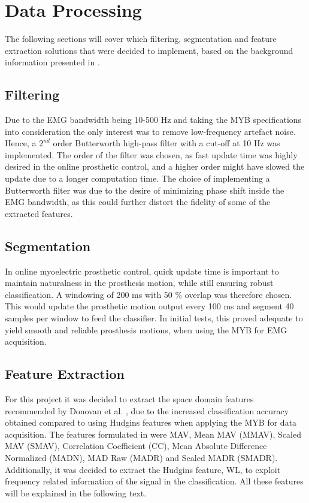 \section{Data Processing}
The following sections will cover which filtering, segmentation and feature extraction solutions that were decided to implement, based on the background information presented in . 

\subsection{Filtering}
Due to the EMG bandwidth being 10-500 Hz and taking the MYB specifications into consideration the only interest was to remove low-frequency artefact noise. Hence, a $2^{nd}$ order Butterworth high-pass filter with a cut-off at 10 Hz was implemented. The order of the filter was chosen, as fast update time was highly desired in the online prosthetic control, and a higher order might have slowed the update due to a longer computation time. The choice of implementing a Butterworth filter was due to the desire of minimizing phase shift inside the EMG bandwidth, as this could further distort the fidelity of some of the extracted features. 

\subsection{Segmentation}
In online myoelectric prosthetic control, quick update time is important to maintain naturalness in the prosthesis motion, while still ensuring robust classification. A windowing of 200 ms with 50 \% overlap was therefore chosen. This would update the prosthetic motion output every 100 ms and segment 40 samples per window to feed the classifier. In initial tests, this proved adequate to yield smooth and reliable prosthesis motions, when using the MYB for EMG acquisition. 

\subsection{Feature Extraction}
For this project it was decided to extract the space domain features recommended by Donovan et al. \cite{Donovan2017}, due to the increased classification accuracy obtained compared to using Hudgins features when applying the MYB for data acquisition. The features formulated in \cite{Donovan2017} were MAV, Mean MAV (MMAV), Scaled MAV (SMAV), Correlation Coefficient (CC), Mean Absolute Difference Normalized (MADN), MAD Raw (MADR) and Scaled MADR (SMADR). Additionally, it was decided to extract the Hudgins feature, WL, to exploit frequency related information of the signal in the classification. All these features will be explained in the following text. 

